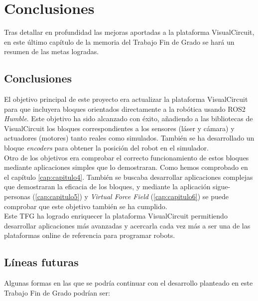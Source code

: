 \chapter{Conclusiones}
\label{cap:capitulo7}

Tras detallar en profundidad las mejoras aportadas a la plataforma VisualCircuit, en este último capítulo de la memoria del
Trabajo Fin de Grado se hará un resumen de las metas logradas.

\section{Conclusiones}

El objetivo principal de este proyecto era actualizar la plataforma VisualCircuit para que incluyera bloques orientados directamente a
la robótica usando ROS2 \textit{Humble}. Este objetivo ha sido alcanzado con éxito, añadiendo a las bibliotecas de VisualCircuit los bloques
correspondientes a los sensores (láser y cámara) y actuadores (motores) tanto reales como simulados.
También se ha desarrollado un bloque \textit{encoders} para obtener la posición del robot en el simulador.\\

Otro de los objetivos era comprobar el correcto funcionamiento de estos bloques mediante aplicaciones simples que lo demostraran. Como
hemos comprobado en el capítulo \ref{cap:capitulo4}. También se buscaba desarrollar aplicaciones complejas que demostraran la eficacia de
los bloques, y mediante la aplicación sigue-personas (\ref{cap:capitulo5}) y \textit{Virtual Force Field} (\ref{cap:capitulo6}) se puede
comprobar que este objetivo también se ha cumplido.\\

Este TFG ha logrado enriquecer la plataforma VisualCircuit permitiendo desarrollar aplicaciones más avanzadas y acercarla cada vez más a
ser una de las plataformas online de referencia para programar robots.

\newpage

\section{Líneas futuras}

Algunas formas en las que se podría continuar con el desarrollo planteado en este Trabajo Fin de Grado podrían ser:

